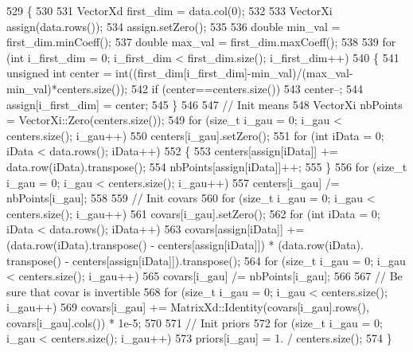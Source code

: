 \begin{DoxyCode}
529 \{
530 
531   VectorXd first\_dim = data.col(0);
532 
533   VectorXi assign(data.rows());
534   assign.setZero();
535 
536   \textcolor{keywordtype}{double} min\_val = first\_dim.minCoeff();
537   \textcolor{keywordtype}{double} max\_val = first\_dim.maxCoeff();
538 
539   \textcolor{keywordflow}{for} (\textcolor{keywordtype}{int} i\_first\_dim = 0; i\_first\_dim < first\_dim.size(); i\_first\_dim++)
540   \{
541     \textcolor{keywordtype}{unsigned} \textcolor{keywordtype}{int} center = int((first\_dim[i\_first\_dim]-min\_val)/(max\_val-min\_val)*centers.size());
542     \textcolor{keywordflow}{if} (center==centers.size())
543       center--;
544     assign[i\_first\_dim] = center;
545   \}
546   
547   \textcolor{comment}{// Init means}
548   VectorXi nbPoints = VectorXi::Zero(centers.size());
549   \textcolor{keywordflow}{for} (\textcolor{keywordtype}{size\_t} i\_gau = 0; i\_gau < centers.size(); i\_gau++)
550     centers[i\_gau].setZero();
551   \textcolor{keywordflow}{for} (\textcolor{keywordtype}{int} iData = 0; iData < data.rows(); iData++)
552   \{
553     centers[assign[iData]] += data.row(iData).transpose();
554     nbPoints[assign[iData]]++;
555   \}
556   \textcolor{keywordflow}{for} (\textcolor{keywordtype}{size\_t} i\_gau = 0; i\_gau < centers.size(); i\_gau++)
557     centers[i\_gau] /= nbPoints[i\_gau];
558 
559   \textcolor{comment}{// Init covars}
560   \textcolor{keywordflow}{for} (\textcolor{keywordtype}{size\_t} i\_gau = 0; i\_gau < centers.size(); i\_gau++)
561     covars[i\_gau].setZero();
562   \textcolor{keywordflow}{for} (\textcolor{keywordtype}{int} iData = 0; iData < data.rows(); iData++)
563     covars[assign[iData]] += (data.row(iData).transpose() - centers[assign[iData]]) * (data.row(iData).
      transpose() - centers[assign[iData]]).transpose();
564   \textcolor{keywordflow}{for} (\textcolor{keywordtype}{size\_t} i\_gau = 0; i\_gau < centers.size(); i\_gau++)
565     covars[i\_gau] /= nbPoints[i\_gau];
566 
567   \textcolor{comment}{// Be sure that covar is invertible}
568   \textcolor{keywordflow}{for} (\textcolor{keywordtype}{size\_t} i\_gau = 0; i\_gau < centers.size(); i\_gau++)
569       covars[i\_gau] += MatrixXd::Identity(covars[i\_gau].rows(), covars[i\_gau].cols()) * 1e-5;
570 
571   \textcolor{comment}{// Init priors}
572   \textcolor{keywordflow}{for} (\textcolor{keywordtype}{size\_t} i\_gau = 0; i\_gau < centers.size(); i\_gau++)
573     priors[i\_gau] = 1. / centers.size();
574 \}
\end{DoxyCode}
